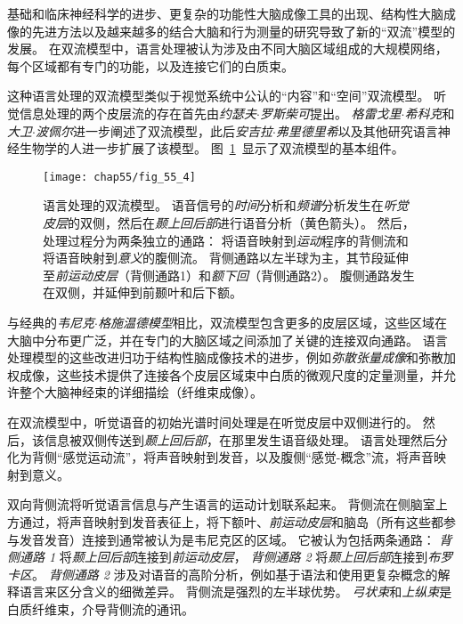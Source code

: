 基础和临床神经科学的进步、更复杂的功能性大脑成像工具的出现、结构性大脑成像的先进方法以及越来越多的结合大脑和行为测量的研究导致了新的“双流”模型的发展。
在双流模型中，语言处理被认为涉及由不同大脑区域组成的大规模网络，每个区域都有专门的功能，以及连接它们的白质束。


这种语言处理的双流模型类似于视觉系统中公认的“内容”和“空间”双流模型。
听觉信息处理的两个皮层流的存在首先由\textit{约瑟夫$\cdot$罗斯柴可}提出。
\textit{格雷戈里$\cdot$希科克}和\textit{大卫$\cdot$波佩尔}进一步阐述了双流模型，此后\textit{安吉拉$\cdot$弗里德里希}以及其他研究语言神经生物学的人进一步扩展了该模型。
图~\ref{fig:55_4}~显示了双流模型的基本组件。


\begin{figure}[htbp]
	\centering
	\texttt{[image: chap55/fig\_55\_4]}
	\caption{语言处理的双流模型。
		语音信号的\textit{时间}分析和\textit{频谱}分析发生在\textit{听觉皮层}的双侧，然后在\textit{颞上回后部}进行语音分析（黄色箭头）。
		然后，处理过程分为两条独立的通路：
		将语音映射到\textit{运动}程序的背侧流和将语音映射到\textit{意义}的腹侧流。
		背侧通路以左半球为主，其节段延伸至\textit{前运动皮层}（背侧通路1）和\textit{额下回}（背侧通路2）。
		腹侧通路发生在双侧，并延伸到前颞叶和后下额\cite{hickok2007cortical,skeide2016ontogeny}。}
	\label{fig:55_4}
\end{figure}


与经典的\textit{韦尼克$\cdot$格施温德模型}相比，双流模型包含更多的皮层区域，这些区域在大脑中分布更广泛，并在专门的大脑区域之间添加了关键的连接双向通路。
语言处理模型的这些改进归功于结构性脑成像技术的进步，例如\textit{弥散张量成像}和弥散加权成像，这些技术提供了连接各个皮层区域束中白质的微观尺度的定量测量，并允许整个大脑神经束的详细描绘（纤维束成像）。


在双流模型中，听觉语音的初始光谱时间处理是在听觉皮层中双侧进行的。
然后，该信息被双侧传送到\textit{颞上回后部}，在那里发生语音级处理。
语言处理然后分化为背侧“感觉运动流”，将声音映射到发音，以及腹侧“感觉-概念”流，将声音映射到意义。


双向背侧流将听觉语言信息与产生语言的运动计划联系起来。
背侧流在侧脑室上方通过，将声音映射到发音表征上，将下额叶、\textit{前运动皮层}和脑岛（所有这些都参与发音发音）连接到通常被认为是韦尼克区的区域。
它被认为包括两条通路：
\textit{背侧通路 1} 将\textit{颞上回后部}连接到\textit{前运动皮层}，
\textit{背侧通路 2} 将\textit{颞上回后部}连接到\textit{布罗卡区}。
\textit{背侧通路 2} 涉及对语音的高阶分析，例如基于语法和使用更复杂概念的解释语言来区分含义的细微差异。
背侧流是强烈的左半球优势。
\textit{弓状束}和\textit{上纵束}是白质纤维束，介导背侧流的通讯。


